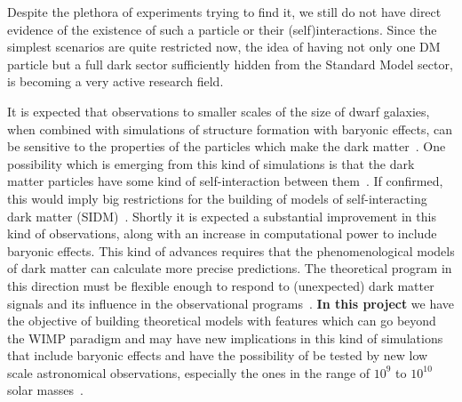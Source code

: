 \documentclass[a4paper,10pt,epsfig,epsf,amsfonts,amsmath]{article}
\begin{document}
\begin{old}
Despite
the plethora of experiments trying to find it, we still do not have direct evidence of
the existence of such a particle or their (self)interactions.
Since the simplest scenarios are quite restricted now, the idea of
having not only one DM particle but a full dark sector sufficiently
hidden from the Standard Model sector, is becoming a very active
research field.

It is expected that observations to smaller scales of the size of
dwarf galaxies, when combined with simulations of structure formation
with baryonic effects, can be sensitive to the properties of the
particles which make the dark matter~\cite{Buckley:2017ijx}.  One
possibility which is emerging from this kind of simulations is that
the dark matter particles have some kind of self-interaction between
them~\cite{Kamada:2016euw, Tulin:2017ara}.  If confirmed, this would
imply big restrictions for the building of models of self-interacting
dark matter (SIDM)~\cite{Bringmann:2016din}.  Shortly it is
expected a substantial improvement in this kind of observations, along
with an increase in computational power to include baryonic effects.
This kind of advances requires that the phenomenological models of dark
matter can calculate more precise predictions. The theoretical program
in this direction must be flexible enough to respond to
(unexpected) dark matter signals and its influence in the
observational programs~\cite{Buckley:2017ijx}.  {\bf In this project} we
have the objective of building theoretical models with features which can
go beyond the WIMP paradigm and may have new implications in this kind
of simulations that include baryonic effects and have the possibility
of be tested by new low scale astronomical observations, especially the
ones in the range of  $10^9$ to  $10^{10}$ solar masses~\cite{Buckley:2017ijx}. 
\end{old}
\end{document}
